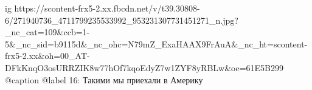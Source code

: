  
 
 
 
 

\ifcmt
  ig https://scontent-frx5-2.xx.fbcdn.net/v/t39.30808-6/271940736_4711799235533992_953231307731451271_n.jpg?_nc_cat=109&ccb=1-5&_nc_sid=b9115d&_nc_ohc=N79mZ_ExaHAAX9FrAuA&_nc_ht=scontent-frx5-2.xx&oh=00_AT-DFkKnqO3osURRZIK8w77hOf7kqoEdyZ7w1ZYF8yRBLw&oe=61E5B299
  @caption @label 16: Такими мы приехали в Америку
\fi
